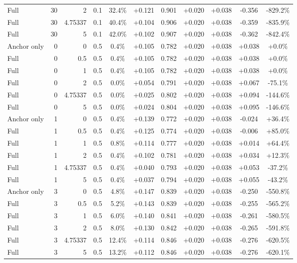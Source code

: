 \begin{table}[htbp]
\begin{tabular}{lrrrccccccc}
Full & 30 & 2 & 0.1 & 32.4\% & +0.121 & 0.901 & +0.020 & +0.038 & -0.356 & -829.2\% \\
Full & 30 & 4.75337 & 0.1 & 40.4\% & +0.104 & 0.906 & +0.020 & +0.038 & -0.359 & -835.9\% \\
Full & 30 & 5 & 0.1 & 42.0\% & +0.102 & 0.907 & +0.020 & +0.038 & -0.362 & -842.4\% \\
Anchor only & 0 & 0 & 0.5 & 0.4\% & +0.105 & 0.782 & +0.020 & +0.038 & +0.038 & +0.0\% \\
Full & 0 & 0.5 & 0.5 & 0.4\% & +0.105 & 0.782 & +0.020 & +0.038 & +0.038 & +0.0\% \\
Full & 0 & 1 & 0.5 & 0.4\% & +0.105 & 0.782 & +0.020 & +0.038 & +0.038 & +0.0\% \\
Full & 0 & 2 & 0.5 & 0.0\% & +0.054 & 0.791 & +0.020 & +0.038 & +0.067 & -75.1\% \\
Full & 0 & 4.75337 & 0.5 & 0.0\% & +0.025 & 0.802 & +0.020 & +0.038 & +0.094 & -144.6\% \\
Full & 0 & 5 & 0.5 & 0.0\% & +0.024 & 0.804 & +0.020 & +0.038 & +0.095 & -146.6\% \\
Anchor only & 1 & 0 & 0.5 & 0.4\% & +0.139 & 0.772 & +0.020 & +0.038 & -0.024 & +36.4\% \\
Full & 1 & 0.5 & 0.5 & 0.4\% & +0.125 & 0.774 & +0.020 & +0.038 & -0.006 & +85.0\% \\
Full & 1 & 1 & 0.5 & 0.8\% & +0.114 & 0.777 & +0.020 & +0.038 & +0.014 & +64.4\% \\
Full & 1 & 2 & 0.5 & 0.4\% & +0.102 & 0.781 & +0.020 & +0.038 & +0.034 & +12.3\% \\
Full & 1 & 4.75337 & 0.5 & 0.4\% & +0.040 & 0.793 & +0.020 & +0.038 & +0.053 & -37.2\% \\
Full & 1 & 5 & 0.5 & 0.4\% & +0.037 & 0.794 & +0.020 & +0.038 & +0.055 & -43.2\% \\
Anchor only & 3 & 0 & 0.5 & 4.8\% & +0.147 & 0.839 & +0.020 & +0.038 & -0.250 & -550.8\% \\
Full & 3 & 0.5 & 0.5 & 5.2\% & +0.143 & 0.839 & +0.020 & +0.038 & -0.255 & -565.2\% \\
Full & 3 & 1 & 0.5 & 6.0\% & +0.140 & 0.841 & +0.020 & +0.038 & -0.261 & -580.5\% \\
Full & 3 & 2 & 0.5 & 8.0\% & +0.130 & 0.842 & +0.020 & +0.038 & -0.265 & -591.8\% \\
Full & 3 & 4.75337 & 0.5 & 12.4\% & +0.114 & 0.846 & +0.020 & +0.038 & -0.276 & -620.5\% \\
Full & 3 & 5 & 0.5 & 13.2\% & +0.112 & 0.846 & +0.020 & +0.038 & -0.276 & -620.1\% \\

\end{tabular}
\end{table}
